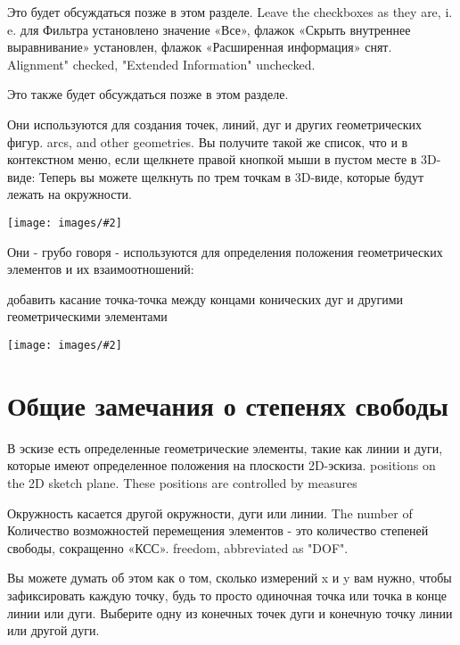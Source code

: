 \documentclass[12pt,titlepage]{article}
\newcommand{\img}[2]{\vspace{2ex}\noindent\texttt{[image: images/\#2]}}
\begin{document}
\begin{description}
\item [Список ограничений.] Это будет обсуждаться позже в этом разделе. Leave
      the checkboxes as they are, i.\,e. для Фильтра установлено значение «Все», флажок «Скрыть внутреннее выравнивание» установлен, флажок «Расширенная информация» снят.
      Alignment" checked, "Extended Information" unchecked. 
\item [Список Элементов.] Это также будет обсуждаться позже в этом разделе.
\item [Инструменты геометрии эскиза.] Они используются для создания точек, линий, дуг и других геометрических фигур.
      arcs, and other geometries. Вы получите такой же список, что и в контекстном меню, если щелкнете правой кнопкой мыши в пустом месте в 3D-виде:
      Теперь вы можете щелкнуть по трем точкам в 3D-виде, которые будут лежать на окружности.

\hspace*{-\leftmargini}\img{width=\textwidth}{GeomElements}

\item [Инструменты ограничения эскиза.] Они - грубо говоря - используются для определения положения геометрических элементов и их взаимоотношений:
      \item добавить касание точка-точка между концами конических дуг и другими геометрическими элементами

\hspace*{-\leftmargini}\img{width=\textwidth}{Constraints}
\end{description}

\section{Общие замечания о степенях свободы}
В эскизе есть определенные геометрические элементы, такие как линии и дуги, которые имеют определенное положения на плоскости 2D-эскиза.
positions on the 2D sketch plane. These positions are controlled by measures
\item Окружность касается другой окружности, дуги или линии. The number of
Количество возможностей перемещения элементов - это количество степеней свободы, сокращенно «КСС».
freedom, abbreviated as "DOF".

Вы можете думать об этом как о том, сколько измерений x и y вам нужно, чтобы зафиксировать каждую точку, будь то просто одиночная точка или точка в конце линии или дуги.
Выберите одну из конечных точек дуги и конечную точку линии или другой дуги.
\end{document}
